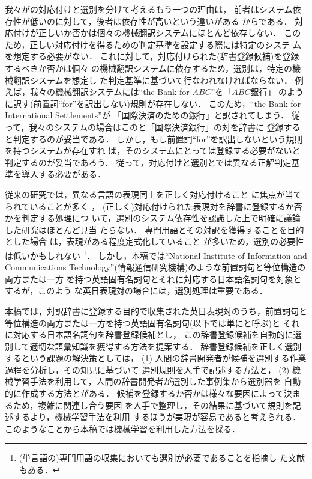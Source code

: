 我々が{\EJP}の対応付けと選別を分けて考えるもう一つの理由は，
前者はシステム依存性が低いのに対して，後者は依存性が高いという違いがある
からである．
対応付けが正しいか否かは個々の機械翻訳システムにほとんど依存しない．
このため，正しい対応付けを得るための判定基準を設定する際には特定のシステ
ムを想定する必要がない．
これに対して，対応付けられた{\EJP}(辞書登録候補)を登録するべきか否かは個々
の機械翻訳システムに依存するため，選別は，特定の機械翻訳システムを想定し
た判定基準に基づいて行なわれなければならない．
例えば，我々の機械翻訳システムには``the Bank for $ABC$''を「$ABC$銀行」
のように訳す(前置詞``for''を訳出しない)規則が存在しない．
このため，``the Bank for International Settlements''が
「国際決済のための銀行」と訳されてしまう．
従って，我々のシステムの場合はこの{\ENP}と「国際決済銀行」の対を辞書に
登録すると判定するのが妥当である．
しかし，もし前置詞``for''を訳出しないという規則を持つシステムが存在すれ
ば，そのシステムにとっては登録する必要がないと判定するのが妥当であろう．
従って，対応付けと選別とでは異なる正解判定基準を導入する必要がある．

従来の研究では，異なる言語の表現同士を正しく対応付けること
に焦点が当てられていることが多く
\cite{Smadja96,Melamed99,Le00,Mcewan02,Tufis02,Utsuro02,Sadat03,Sato03,Yamamoto03,Ayan04,Izuha04,Sahlgren04}，
(正しく)対応付けられた表現対を辞書に登録するか否かを判定する処理につ
いて，選別のシステム依存性を認識した上で明確に議論した研究はほとんど見当
たらない．
専門用語とその対訳を獲得することを目的とした場合
\cite{Dagan94,Resnik97,Tiedemann00}は，表現がある程度定式化していること
が多いため，選別の必要性は低いかもしれない
\footnote{(単言語の)専門用語の収集においても選別が必要であることを指摘し
た文献もある\cite{Sasaki05}．}． 
しかし，本稿では``National Institute of Information and Communications 
Technology''(情報通信研究機構)のような前置詞句と等位構造の両方または一方
を持つ英語固有名詞句とそれに対応する日本語名詞句を対象とするが，このよう
な英日表現対の場合には，選別処理は重要である．

本稿では，対訳辞書に登録する目的で収集された英日表現対のうち，前置詞句と
等位構造の両方または一方を持つ英語固有名詞句(以下では単に{\ENP}と呼ぶ)と
それに対応する日本語名詞句を辞書登録候補とし，
この辞書登録候補を自動的に選別して適切な語彙知識を獲得する方法を提案する．
辞書登録候補を正しく選別するという課題の解決策としては，
(1) 人間の辞書開発者が候補を選別する作業過程を分析し，その知見に基づいて
選別規則を人手で記述する方法と，
(2) 機械学習手法を利用して，人間の辞書開発者が選別した事例集から選別器を
自動的に作成する方法とがある．
候補を登録するか否かは様々な要因によって決まるため，複雑に関連し合う要因
を人手で整理し，その結果に基づいて規則を記述するより，機械学習手法を利用
するほうが実現が容易であると考えられる．
このようなことから本稿では機械学習を利用した方法を採る．

